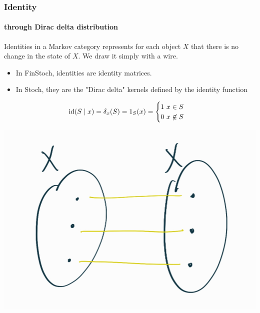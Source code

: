 \begin{frame}
    \frametitle{Identity}
    \framesubtitle{through Dirac delta distribution}
    Identities in a Markov category represents for each object $X$ that there is no change in the state of $X$. We draw it simply with a wire.\pause
    \begin{itemize}
        \item In FinStoch, identities are identity matrices. 
        \item In Stoch, they are the "Dirac delta" kernels defined by the identity function
\end{itemize}
\begin{minipage}{.48\textwidth}
    \[
        \text{\normalfont id} (S\mid x) = \delta_x (S) = 1_S(x) = \begin{cases} 1\ x\in S\\ 0\ x\not \in S
        \end{cases}
    \]
\end{minipage}
\hfill
\begin{minipage}{.48\textwidth}
    \includegraphics[width=\textwidth]{graphics/markov_delta.png}
\end{minipage}
\end{frame}


